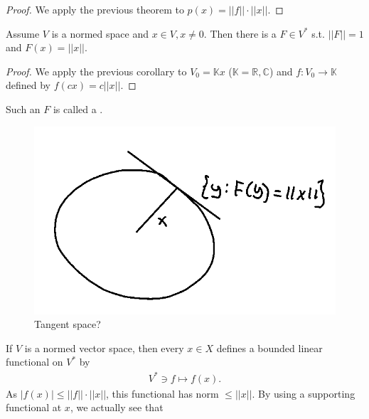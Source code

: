 \ifdetailed
\begin{proof}
    We apply the previous theorem to \(p(x)=||f||\cdot ||x||\).
\end{proof}
\fi 
\begin{corollary}
    Assume \(V\) is a normed space and \(x\in V, x\neq0\). Then there is a \(F\in V^*\) s.t. \(||F||=1\) and \(F(x) = ||x||\).
\end{corollary}
\ifdetailed
\begin{proof}
We apply the previous corollary to \(V_0 = \mathbb{K}x\) (\(\mathbb{K}=\mathbb{R},\mathbb{C}\)) and \(f:V_0\rightarrow \mathbb{K}\) defined by \(f(cx) = c||x||\).
\end{proof}
\fi
Such an \(F\) is called a . 
\begin{figure}[H]
    \centering
    \includegraphics[scale=0.4]{../Figs/hanah_banach1.png}
    \caption{Tangent space?}
\end{figure}
If \(V\) is a normed vector space, then every \(x\in X\) defines a bounded linear functional on \(V^*\) by 
\begin{align*}
    V^*\ni f\mapsto f(x).
\end{align*}
As \(|f(x)|\leq ||f||\cdot ||x||\), this functional has norm \(\leq ||x||\). By using a supporting functional at \(x\), we actually see that
